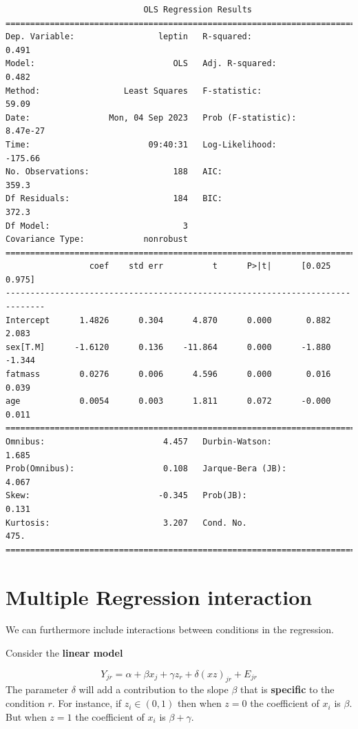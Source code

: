 \documentclass[
]{book}
\begin{document}
\begin{verbatim}
                            OLS Regression Results                            
==============================================================================
Dep. Variable:                 leptin   R-squared:                       0.491
Model:                            OLS   Adj. R-squared:                  0.482
Method:                 Least Squares   F-statistic:                     59.09
Date:                Mon, 04 Sep 2023   Prob (F-statistic):           8.47e-27
Time:                        09:40:31   Log-Likelihood:                -175.66
No. Observations:                 188   AIC:                             359.3
Df Residuals:                     184   BIC:                             372.3
Df Model:                           3                                         
Covariance Type:            nonrobust                                         
==============================================================================
                 coef    std err          t      P>|t|      [0.025      0.975]
------------------------------------------------------------------------------
Intercept      1.4826      0.304      4.870      0.000       0.882       2.083
sex[T.M]      -1.6120      0.136    -11.864      0.000      -1.880      -1.344
fatmass        0.0276      0.006      4.596      0.000       0.016       0.039
age            0.0054      0.003      1.811      0.072      -0.000       0.011
==============================================================================
Omnibus:                        4.457   Durbin-Watson:                   1.685
Prob(Omnibus):                  0.108   Jarque-Bera (JB):                4.067
Skew:                          -0.345   Prob(JB):                        0.131
Kurtosis:                       3.207   Cond. No.                         475.
==============================================================================
\end{verbatim}

\hypertarget{multiple-regression-interaction}{%
\section{Multiple Regression interaction}\label{multiple-regression-interaction}}

We can furthermore include interactions between conditions in the regression.

Consider the \textbf{linear model}

\[Y_{jr} = \alpha + \beta x_{j} +\gamma z_{r} + \delta (xz)_{jr} +E_{jr}\]
The parameter \(\delta\) will add a contribution to the slope \(\beta\) that is \textbf{specific} to the condition \(r\). For instance, if \(z_i \in (0,1)\) then when \(z=0\) the coefficient of \(x_i\) is \(\beta\). But when \(z=1\) the coefficient of \(x_i\) is \(\beta+\gamma\).
\end{document}
